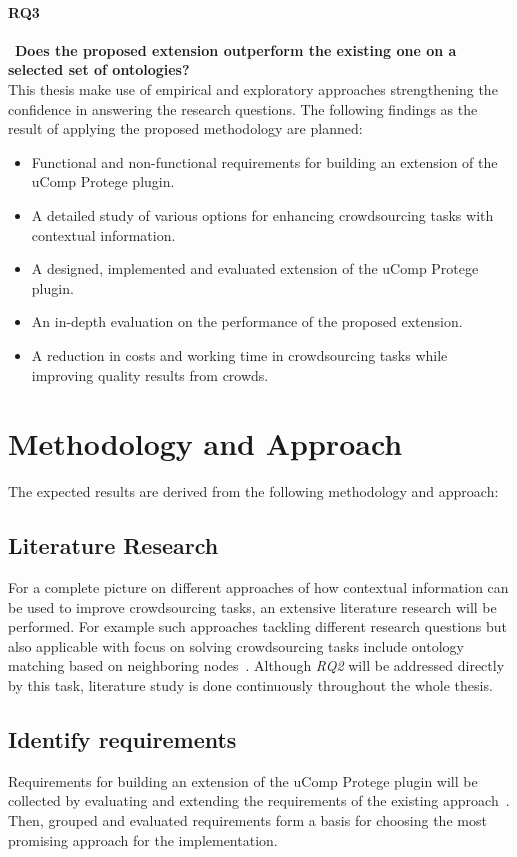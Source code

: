 \documentclass[12pt, notitlepage]{article}
\begin{document}
\paragraph{RQ3}~\textbf{Does the proposed extension outperform the existing one on a selected set of ontologies?}\\
This thesis make use of empirical and exploratory approaches strengthening the confidence in answering the research questions. The following findings as the result of applying the proposed methodology are planned:
\begin{itemize}
	\item Functional and non-functional requirements for building an extension of the uComp Protege plugin.
	\item A detailed study of various options for enhancing crowdsourcing tasks with contextual information.
	\item A designed, implemented and evaluated extension of the uComp Protege plugin.
	\item An in-depth evaluation on the performance of the proposed extension.
	\item A reduction in costs and working time in crowdsourcing tasks while improving quality results from crowds.
\end{itemize}
\section{Methodology and Approach}
The expected results are derived from the following methodology and approach:
\subsection{Literature Research}
For a complete picture on different approaches of how contextual information can be used to improve crowdsourcing tasks, an extensive literature research will be performed. For example such approaches tackling different research questions but also applicable with focus on solving crowdsourcing tasks include ontology matching based on neighboring nodes~\cite{hoffmann2010context}. Although \emph{RQ2} will be addressed directly by this task, literature study is done continuously throughout the whole thesis. 
\subsection{Identify requirements}
Requirements for building an extension of the uComp Protege plugin will be collected by evaluating and extending the requirements of the existing approach~\cite{wohlgenannt2016crowd}. Then, grouped and evaluated requirements form a basis for choosing the most promising approach for the implementation.
\end{document}
